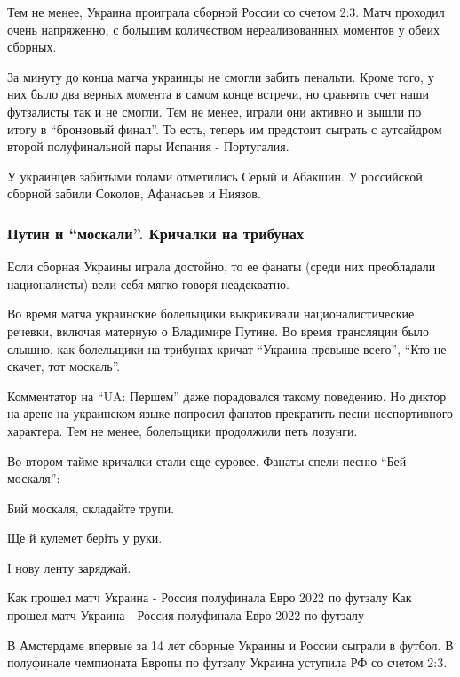 Тем не менее, Украина проиграла сборной России со счетом 2:3. Матч проходил
очень напряженно, с большим количеством нереализованных моментов у обеих
сборных.

За минуту до конца матча украинцы не смогли забить пенальти. Кроме того, у них
было два верных момента в самом конце встречи, но сравнять счет наши футзалисты
так и не смогли. Тем не менее, играли они активно и вышли по итогу в \enquote{бронзовый
финал}. То есть, теперь им предстоит сыграть с аутсайдром второй полуфинальной
пары Испания - Португалия.

У украинцев забитыми голами отметились Серый и Абакшин. У российской сборной
забили Соколов, Афанасьев и Ниязов.

\subsubsection{Путин и \enquote{москали}. Кричалки на трибунах}

Если сборная Украины играла достойно, то ее фанаты (среди них преобладали
националисты) вели себя мягко говоря неадекватно.

Во время матча украинские болельщики выкрикивали националистические речевки,
включая матерную о Владимире Путине. Во время трансляции было слышно, как
болельщики на трибунах кричат \enquote{Украина превыше всего}, \enquote{Кто не скачет, тот
москаль}.


Комментатор на \enquote{UA: Першем} даже порадовался такому поведению. Но
диктор на арене на украинском языке попросил фанатов прекратить песни
неспортивного характера. Тем не менее, болельщики продолжили петь лозунги.

Во втором тайме кричалки стали еще суровее. Фанаты спели песню \enquote{Бей
москаля}:

Бий москаля, складайте трупи.

Ще й кулемет беріть у руки.

І нову ленту заряджай.


Как прошел матч Украина - Россия полуфинала Евро 2022 по футзалу
Как прошел матч Украина - Россия полуфинала Евро 2022 по футзалу

В Амстердаме впервые за 14 лет сборные Украины и России сыграли в футбол. В
полуфинале чемпионата Европы по футзалу Украина уступила РФ со счетом 2:3.

